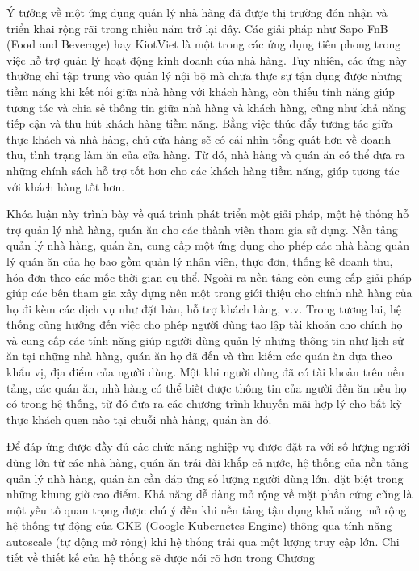 Ý tưởng về một ứng dụng quản lý nhà hàng đã được thị trường đón nhận và triển khai rộng rãi trong nhiều năm trở lại đây.
Các giải pháp như Sapo FnB (Food and Beverage) hay KiotViet là một trong các ứng dụng tiên phong trong việc hỗ trợ quản lý hoạt động kinh doanh của nhà hàng.
Tuy nhiên, các ứng này thường chỉ tập trung vào quản lý nội bộ mà chưa thực sự tận dụng được những tiềm năng khi kết nối giữa nhà hàng với khách hàng, còn thiếu tính năng giúp tương tác và chia sẻ thông tin giữa nhà hàng và khách hàng, cũng như khả năng tiếp cận và thu hút khách hàng tiềm năng.
Bằng việc thúc đẩy tương tác giữa thực khách và nhà hàng, chủ cửa hàng sẽ có cái nhìn tổng quát hơn về doanh thu, tình trạng làm ăn của cửa hàng.
Từ đó, nhà hàng và quán ăn có thể đưa ra những chính sách hỗ trợ tốt hơn cho các khách hàng tiềm năng, giúp tương tác với khách hàng tốt hơn.

Khóa luận này trình bày về quá trình phát triển một giải pháp, một hệ thống hỗ trợ quản lý nhà hàng, quán ăn cho các thành viên tham gia sử dụng.
Nền tảng quản lý nhà hàng, quán ăn, cung cấp một ứng dụng cho phép các nhà hàng quản lý quán ăn của họ bao gồm quản lý nhân viên, thực đơn, thống kê doanh thu, hóa đơn theo các mốc thời gian cụ thể.
Ngoài ra nền tảng còn cung cấp giải pháp giúp các bên tham gia xây dựng nên một trang giới thiệu cho chính nhà hàng của họ đi kèm các dịch vụ như đặt bàn, hỗ trợ khách hàng, v.v.
Trong tương lai, hệ thống cũng hướng đến việc cho phép người dùng tạo lập tài khoản cho chính họ và cung cấp các tính năng giúp người dùng quản lý những thông tin như lịch sử ăn tại những nhà hàng, quán ăn họ đã đến và tìm kiếm các quán ăn dựa theo khẩu vị, địa điểm của người dùng.
Một khi người dùng đã có tài khoản trên nền tảng, các quán ăn, nhà hàng có thể biết được thông tin của người đến ăn nếu họ có trong hệ thống, từ đó đưa ra các chương trình khuyến mãi hợp lý cho bất kỳ thực khách quen nào tại chuỗi nhà hàng, quán ăn đó.

Để đáp ứng được đầy đủ các chức năng nghiệp vụ được đặt ra với số lượng người dùng lớn từ các nhà hàng, quán ăn trải dài khắp cả nước, hệ thống của nền tảng quản lý nhà hàng, quán ăn cần đáp ứng số lượng người dùng lớn, đặt biệt trong những khung giờ cao điểm.
Khả năng dễ dàng mở rộng về mặt phần cứng  cũng là một yếu tố quan trọng được chú ý đến khi nền tảng tận dụng khả năng mở rộng hệ thống tự động của GKE (Google Kubernetes Engine) thông qua tính năng autoscale (tự động mở rộng) khi hệ thống trải qua một lượng truy cập lớn.
Chi tiết về thiết kế của hệ thống sẽ được nói rõ hơn trong Chương~

